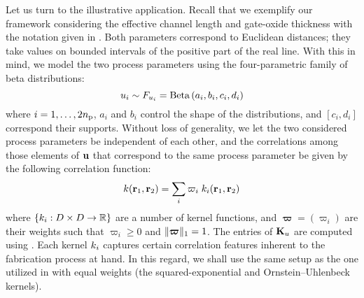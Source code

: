 Let us turn to the illustrative application.
Recall that we exemplify our framework considering the effective channel length and gate-oxide thickness with the notation given in .
Both parameters correspond to Euclidean distances; they take values on bounded intervals of the positive part of the real line.
With this in mind, we model the two process parameters using the four-parametric family of beta distributions:
\begin{equation*}
  \u_i \sim \distribution_{\u_i} = \betaDistribution{a_i, b_i, c_i, d_i}
\end{equation*}
where $i = 1, \dots, 2 \nprocs$, $a_i$ and $b_i$ control the shape of the distributions, and $[ c_i, d_i ]$ correspond their supports.
Without loss of generality, we let the two considered process parameters be independent of each other, and the correlations among those elements of $\vu$ that correspond to the same process parameter be given by the following correlation function:
\begin{equation} \elab{correlation-function}
  \fCorr(\vr_1, \vr_2) = \sum_i \varpi_i \; \fCorr_i(\vr_1, \vr_2)
\end{equation}
where $\{ \fCorr_i: \domain \times \domain \to \real \}$ are a number of kernel functions, and $\bm{\varpi} = (\varpi_i)$ are their weights such that $\varpi_i \geq 0$ and $\norm[1]{\bm{\varpi}} = 1$.
The entries of $\mCorr_\u$ are computed using .
Each kernel $\fCorr_i$ captures certain correlation features inherent to the fabrication process at hand.
In this regard, we shall use the same setup as the one utilized in \cite{ukhov2014} with equal weights (the squared-exponential and Ornstein--Uhlenbeck kernels).

